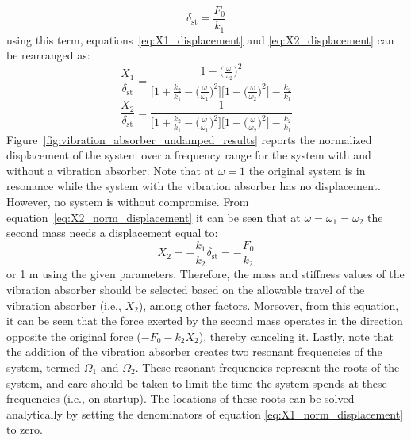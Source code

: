 \documentclass[12pt,letter]{article}
\begin{document}
\begin{equation}
\delta_{\text{st}} = \frac{F_0}{k_1}
\end{equation}
using this term, equations~\ref{eq:X1_displacement} and \ref{eq:X2_displacement} can be rearranged as:
\begin{equation}
\frac{X_1}{\delta_{\text{st}}} = \frac{1 - \big(\frac{\omega}{\omega_2} \big)^2 }{\Big[1 + \frac{k_2}{k_1} - \big(\frac{\omega}{\omega_1} \big)^2 \Big] \Big[ 1- \big(\frac{\omega}{\omega_2} \big)^2 \Big] -\frac{k_2}{k_1}}
\label{eq:X1_norm_displacement}
\end{equation}
\begin{equation}
\frac{X_2}{\delta_{\text{st}}} = \frac{1}{\Big[1 + \frac{k_2}{k_1} - \big(\frac{\omega}{\omega_1} \big)^2 \Big] \Big[ 1- \big(\frac{\omega}{\omega_2} \big)^2 \Big] -\frac{k_2}{k_1}}
\label{eq:X2_norm_displacement}
\end{equation}
Figure~\ref{fig:vibration_absorber_undamped_results} reports the normalized displacement of the system over a frequency range for the system with and without a vibration absorber. Note that at $\omega=1$ the original system is in resonance while the system with the vibration absorber has no displacement. However, no system is without compromise. From equation~\ref{eq:X2_norm_displacement} it can be seen that at $\omega = \omega_1 = \omega_2$ the second mass needs a displacement equal to:
\begin{equation}
X_2 = -\frac{k_1}{k_2}\delta_{\text{st}} = -\frac{F_0}{k_2}
\end{equation}
or 1 m using the given parameters. Therefore, the mass and stiffness values of the vibration absorber should be selected based on the allowable travel of the vibration absorber (i.e., $X_2$), among other factors. Moreover, from this equation, it can be seen that the force exerted by the second mass operates in the direction opposite the original force ($-F_0 - k_2 X_2$), thereby canceling it. Lastly, note that the addition of the vibration absorber creates two resonant frequencies of the system, termed $\Omega_1$ and $\Omega_2$. These resonant frequencies represent the roots of the system, and care should be taken to limit the time the system spends at these frequencies (i.e., on startup). The locations of these roots can be solved analytically by setting the denominators of equation \ref{eq:X1_norm_displacement} to zero.

\end{document}
